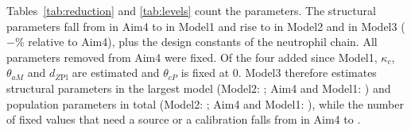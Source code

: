 \documentclass[11pt]{article}
\begin{document}
Tables~\ref{tab:reduction} and \ref{tab:levels} count the parameters. The structural parameters fall from \valNStructAimFour{} in Aim4 to \valNStructModelOne{} in Model1 and rise to \valNStructModelTwo{} in Model2 and \valNStruct{} in Model3 ($-$\valReductionPct\% relative to Aim4), plus the \valNDesign{} design constants of the neutrophil chain. All parameters removed from Aim4 were fixed. Of the four added since Model1, $\kappa_c$, $\theta_{aM}$ and $d_{Z\mathrm{Pl}}$ are estimated and $\theta_{cP}$ is fixed at 0. Model3 therefore estimates \valNEst{} structural parameters in the largest model (Model2: \valNEstModelTwo; Aim4 and Model1: \valNEstModelOne) and \valNPop{} population parameters in total (Model2: \valNPopModelTwo; Aim4 and Model1: \valNPopModelOne), while the number of fixed values that need a source or a calibration falls from \valNFixedAimFour{} in Aim4 to \valNFixed.



\end{document}
